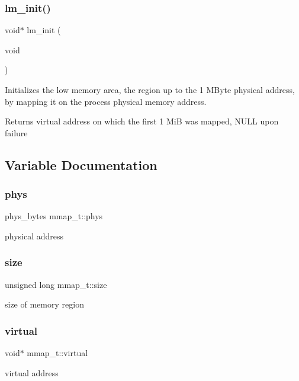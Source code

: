\subsubsection{\texorpdfstring{lm\+\_\+init()}{lm\_init()}}
{\footnotesize\ttfamily void$\ast$ lm\+\_\+init (\begin{DoxyParamCaption}\item[{void}]{ }\end{DoxyParamCaption})}



Initializes the low memory area, the region up to the 1 M\+Byte physical address, by mapping it on the process\textquotesingle{} physical memory address. 

\begin{DoxyReturn}{Returns}
virtual address on which the first 1 MiB was mapped, N\+U\+LL upon failure 
\end{DoxyReturn}


\subsection{Variable Documentation}
\hypertarget{group__lmlib_gaa6ac1ee0e0fadea4a4f85b48c8359ae4}{}\label{group__lmlib_gaa6ac1ee0e0fadea4a4f85b48c8359ae4} 
\subsubsection{\texorpdfstring{phys}{phys}}
{\footnotesize\ttfamily phys\+\_\+bytes mmap\+\_\+t\+::phys}



physical address 

\hypertarget{group__lmlib_gaf1cdc5384a402fddf33f400a5e1e5e45}{}\label{group__lmlib_gaf1cdc5384a402fddf33f400a5e1e5e45} 
\subsubsection{\texorpdfstring{size}{size}}
{\footnotesize\ttfamily unsigned long mmap\+\_\+t\+::size}



size of memory region 

\hypertarget{group__lmlib_ga4de93144fb3ffbceb9bd1f3009d6d98c}{}\label{group__lmlib_ga4de93144fb3ffbceb9bd1f3009d6d98c} 
\subsubsection{\texorpdfstring{virtual}{virtual}}
{\footnotesize\ttfamily void$\ast$ mmap\+\_\+t\+::virtual}



virtual address 

